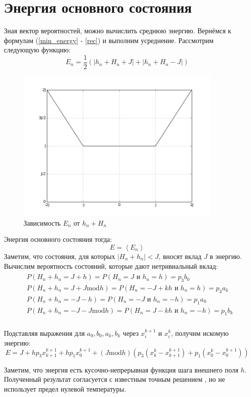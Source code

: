 \section{Энергия основного состояния}
Зная вектор вероятностей, можно вычислить среднюю энергию. Вернёмся к формулам (\ref{min_energy} - \ref{rec}) и выполним усреднение. Рассмотрим следующую функцию:
\begin{equation}
  E_n = \frac 1 2 (|h_n + H_n + J| + |h_n + H_n - J|)
\end{equation}

\begin{figure}
\centering
\includegraphics[width=0.9\textwidth]{figure_1.png}
\caption{Зависимость $E_n$ от $h_n+H_n$}
\end{figure}

Энергия основного состояния тогда:
\begin{equation}
  E = \left< E_n \right>
\end{equation}
Заметим, что состояния, для которых $|H_n + h_n| < J$, вносят вклад $J$ в энергию. Вычислим вероятность состояний, которые дают нетривиальный вклад:
\begin{align}
	\begin{split}
   &P(H_n + h_n = J+h) = P(H_n=J \text{ и } h_n = h) = p_3 b_0\\
   &P(H_n + h_n = J + J \text{mod} h) = P(H_n=-J+kh \text { и } h_n =h)=p_3 a_k\\
   &P(H_n + h_n = -J-h) = P(H_n=-J \text{ и } h_n = -h) = p_1 a_0\\
   &P(H_n + h_n =- J - J \text{mod} h) = P(H_n=J-kh \text{ и } h_n =-h)=p_1 b_k\\
   \end{split}
\end{align}

Подставляя выражения для $a_0, b_0, a_k, b_k$ через $x^{k+1}_i$ и $x^{k}_i$, получим искомую энергию:
\begin{equation}
		E = J + h p_3 x^{k+1}_{k+1}  + h p_1 x^{k+1}_0 + (J \text{mod} h) (p_3 (x^k_k - x^{k+1}_{k+1}) +p_1(x^k_0-x^{k+1}_0))
\end{equation}

Заметим, что энергия есть кусочно-непрерывная функция шага внешнего поля $h$. Полученный результат согласуется с известным точным решением \cite{hamasaki2004exact}, но не использует предел нулевой температуры.



\newpage